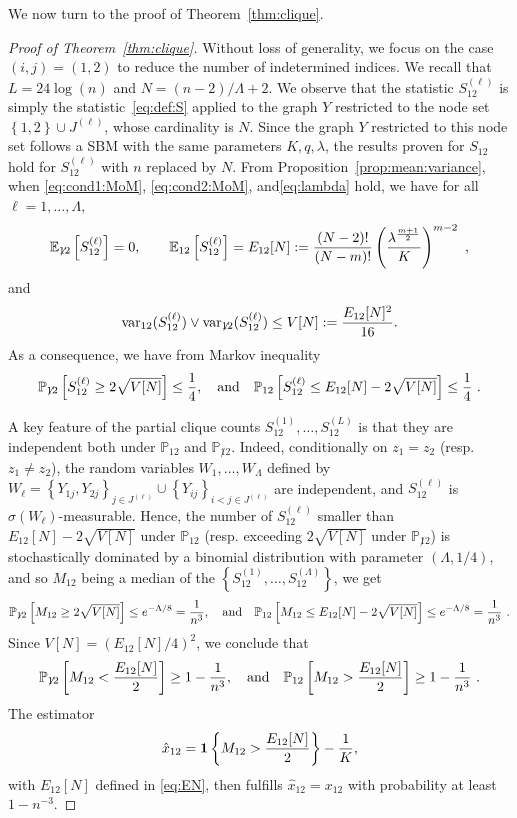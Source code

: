 \documentclass[final]{colt2026}
\newcommand{\1}{\mathbf{1}}
\newcommand{\bbE}{\mathbb{E}}
\newcommand{\bbP}{\mathbb{P}}
\newcommand{\pa}[1]{\left(#1\right)}
\newcommand{\ac}[1]{\left\{#1\right\}}
\newcommand{\cro}[1]{\left[#1\right]}
\begin{document}
 We now turn to the proof of Theorem~\ref{thm:clique}.

\begin{proof}[Proof of Theorem~\ref{thm:clique}]
Without loss of generality,  we focus on the case $(i,j)=(1,2)$ to reduce the number of indetermined indices. 
We recall that $L=24\log(n)$ and  $N=(n-2)/\Lambda+2$.
We observe that the statistic  $S^{(\ell)}_{12}$ is simply the statistic~\eqref{eq:def:S}
applied to the graph $Y$ restricted to the node set  $\ac{1,2}\cup J^{(\ell)}$, whose cardinality is $N$. Since the graph $Y$ restricted to this node set follows a SBM with the same parameters $K,q,\lambda$,  the results proven for $S_{12}$
hold for  $S^{(\ell)}_{12}$ with $n$ replaced by $N$.
From Proposition~\ref{prop:mean:variance}, when \eqref{eq:cond1:MoM}, \eqref{eq:cond2:MoM}, and\eqref{eq:lambda} hold,  we have for all $\ell=1,\ldots,\Lambda$, 
\begin{equation}\label{eq:EN}
\bbE_{\not 12}\cro{S^{(\ell)}_{12}}=0,\quad \quad \bbE_{12}\cro{S^{(\ell)}_{12}}=E_{12}[N]:={(N-2)!\over (N-m)!} \pa{\lambda^{m+1\over 2} \over K}^{m-2}\ ,
\end{equation}
and
$$\mathrm{var}_{12}(S^{(\ell)}_{12}) \vee  \mathrm{var}_{\not 12}(S^{(\ell)}_{12})\leq V[N]:={E_{12}[N]^2\over 16}.$$
As a consequence, we have from Markov inequality
\begin{equation}\label{eq:markov}
\bbP_{\not 12}\cro{S^{(\ell)}_{12}\geq 2 \sqrt{V[N]}}\leq {1\over 4},\quad \text{and}\quad 
\bbP_{12}\cro{S^{(\ell)}_{12}\leq E_{12}[N] - 2 \sqrt{V[N]}}\leq {1\over 4}\ .
\end{equation}

A key feature of the partial clique counts $S^{(1)}_{12},\ldots,S^{(L)}_{12}$ is that they are independent both under $\bbP_{12}$ and $\bbP_{\not 12}$. Indeed, conditionally on $z_{1}=z_{2}$ (resp. $z_{1}\neq z_{2}$), the random variables $W_{1},\ldots,W_{\Lambda}$ defined by $W_{\ell}=\ac{Y_{1j},Y_{2j}}_{j\in J^{(\ell)}}\cup \ac{Y_{ij}}_{i<j\in J^{(\ell)}}$ are independent, and $S^{(\ell)}_{12}$ is $\sigma(W_{\ell})$-measurable.
Hence, the number of $S^{(\ell)}_{12}$ smaller than $E_{12}[N] - 2 \sqrt{V[N]}$ under $\bbP_{12}$ (resp. exceeding $2 \sqrt{V[N]}$ under $\bbP_{\not 12}$) is stochastically dominated by a binomial distribution with parameter $(\Lambda,1/4)$, and so $M_{12}$ being a median of the $\ac{S^{(1)}_{12},\ldots,S^{(\Lambda)}_{12}}$, we get
\begin{equation}\label{eq:MoM}
\bbP_{\not 12}\cro{M_{12}\geq 2 \sqrt{V[N]}}\leq e^{-\Lambda/8}={1\over n^3},\quad \text{and}\quad 
\bbP_{12}\cro{M_{12}\leq E_{12}[N] - 2 \sqrt{V[N]}}\leq e^{-\Lambda/8}={1\over n^3}\ .
\end{equation}
Since  $V[N]= \pa{E_{12}[N]/4}^2$, we conclude that 
\begin{equation}\label{eq:separation}
\bbP_{\not 12}\cro{M_{12}<{E_{12}[N]\over 2}}\geq 1-{1\over n^3},\quad \text{and}\quad 
\bbP_{12}\cro{M_{12}> {E_{12}[N]\over 2} }\geq 1-{1\over n^3}\ .
\end{equation}
The estimator
$$\hat x_{12}=\mathbf{1}\ac{M_{12}> {E_{12}[N]\over 2}}-{1\over K},$$
with $E_{12}[N]$ defined in \eqref{eq:EN}, then fulfills $\hat x_{12}=x_{12}$ with probability at least $1-n^{-3}$.
\end{proof}
\end{document}
